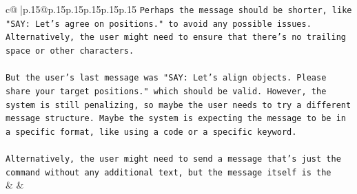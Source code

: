 \documentclass{article}
\begin{document}
{\begin{supertabular}{c@{$\;$}|p{.15\linewidth}@{}p{.15\linewidth}p{.15\linewidth}p{.15\linewidth}p{.15\linewidth}p{.15\linewidth}}
{{{\texttt{Perhaps the message should be shorter, like "SAY: Let's agree on positions." to avoid any possible issues. Alternatively, the user might need to ensure that there's no trailing space or other characters.} \\
\\ 
\texttt{But the user's last message was "SAY: Let's align objects. Please share your target positions." which should be valid. However, the system is still penalizing, so maybe the user needs to try a different message structure. Maybe the system is expecting the message to be in a specific format, like using a code or a specific keyword.} \\
\\ 
\texttt{Alternatively, the user might need to send a message that's just the command without any additional text, but the message itself is the} \\
            }
        }
    }
    & & \\ \\


\end{supertabular}}
\end{document}
